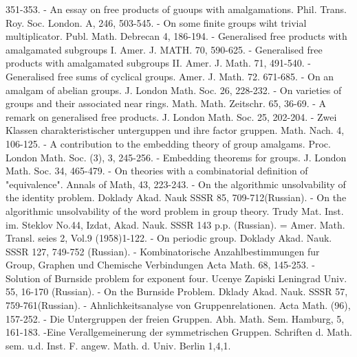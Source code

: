 \begin{thebibliography}{99}
  351-353. 
 - An essay on free products of guoups with
  amalgamations. Phil. Trans. Roy. Soc. London. A, 246, 503-545. 
 - On some finite groups wiht trivial
  multiplicator. Publ. Math. Debrecan 4, 186-194. 
- Generalised free products with
  amalgamated subgroups I. Amer. J. MATH. 70, 590-625. 
- Generalised free products with amalgamated
  subgroups II. Amer. J. Math. 71, 491-540. 
- Generalised free sums of cyclical
  groups. Amer. J. Math. 72. 671-685. 
- On an amalgam of abelian groups. J. London
  Math. Soc. 26, 228-232. 
- On varieties of groups and their associated
  near rings. Math. Math. Zeitschr. 65, 36-69. 
- A remark on
  generalised free products. J. London Math. Soc. 25, 202-204. 
- Zwei Klassen charakteristischer unterguppen
  und ihre factor gruppen. Math. Nach. 4, 106-125. 
- A contribution to the embedding theory of group
  amalgams. Proc. London Math. Soc. (3), 3, 245-256. 
- Embedding theorems for groups. J. London
  Math. Soc. 34, 465-479. 
- On theories with a combinatorial
  definition of "equivalence". Annals of Math, 43, 223-243. 
- On the algorithmic unsolvability of
  the identity problem. Doklady Akad. Nauk SSSR 85, 709-712(Russian). 
- On the algorithmic unsolvability of the word
  problem in group theory. Trudy Mat. Inst. im. Steklov No.44, Izdat,
  Akad. Nauk. SSSR 143 p.p. (Russian). = Amer. Math. Transl. seies 2,
  Vol.9 (1958)1-122.
- On periodic group. Doklady Akad. Nauk. SSSR
  127, 749-752 (Russian). 
- Kombinatorische Anzahlbestimmungen
  fur Group, Graphen und Chemische Verbindungen Acta Math. 68,
  145-253. 
- Solution of Burnside problem for
  exponent four. Ucenye Zapiski Leningrad Univ. 55, 16-170 (Russian). 
- On the Burnside Problem. Dklady
  Akad. Nauk. SSSR 57, 759-761(Russian). 
- Ahnlichkeitsanalyse von
  Gruppenrelationen. Acta Math. (96), 157-252. 
- Die Untergruppen der freien
  Gruppen. Abh. Math. Sem. Hamburg, 5, 161-183. 
-Eine Verallgemeinerung der
  symmetrischen Gruppen. Schriften
  d. Math. sem. u.d. Inst. F. angew. Math. d. Univ. Berlin 1,4,1. 

\end{thebibliography}
